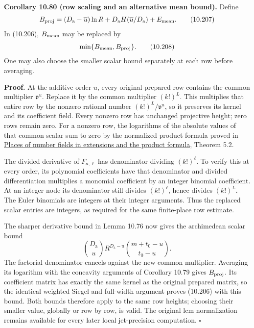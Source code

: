 \documentclass[
  11pt,
  a4paper,
]{article}
\begin{document}
\textbf{Corollary 10.80 (row scaling and an alternative mean bound).}
Define \[
B_{\rm proj}=(D_{\mathrm a}-\overline u)\ln R
+D_{\mathrm a}H(\overline u/D_{\mathrm a})+E_{\rm mean}.
\tag{10.207}
\] In (10.206), \(B_{\rm mean}\) may be replaced by \[
\min\{B_{\rm mean},B_{\rm proj}\}.
\tag{10.208}
\] One may also choose the smaller scalar bound separately at each row
before averaging.

\textbf{Proof.} At the additive order \(u\), every original prepared row
contains the common multiplier \(\mathfrak v^u\). Replace it by the
common multiplier \((k!)^L\). This multiplies that entire row by the
nonzero rational number \((k!)^L/\mathfrak v^u\), so it preserves its
kernel and its coefficient field. Every nonzero row has unchanged
projective height; zero rows remain zero. For a nonzero row, the
logarithms of the absolute values of that common scalar sum to zero by
the normalized product formula proved in
\href{../../NT-LOC/NT-LOC-05.html\#5-norms-and-the-normalized-product-formula}{Places
of number fields in extensions and the product formula}, Theorem 5.2.

The divided derivative of \(F_{a,\ell}\) has denominator dividing
\((k!)^\ell\). To verify this at every order, its polynomial
coefficients have that denominator and divided differentiation
multiplies a monomial coefficient by an integer binomial coefficient. At
an integer node its denominator still divides \((k!)^\ell\), hence
divides \((k!)^L\). The Euler binomials are integers at their integer
arguments. Thus the replaced scalar entries are integers, as required
for the same finite-place row estimate.

The sharper derivative bound in Lemma 10.76 now gives the archimedean
scalar bound \[
\binom{D_{\mathrm a}}u R^{D_{\mathrm a}-u}
\binom{m+t_0-u}{t_0-u}.
\] The factorial denominator cancels against the new common multiplier.
Averaging its logarithm with the concavity arguments of Corollary 10.79
gives \(B_{\rm proj}\). Its coefficient matrix has exactly the same
kernel as the original prepared matrix, so the identical weighted Siegel
and full-width argument proves (10.206) with this bound. Both bounds
therefore apply to the same row heights; choosing their smaller value,
globally or row by row, is valid. The original lcm normalization remains
available for every later local jet-precision computation. \(\square\)
\end{document}

